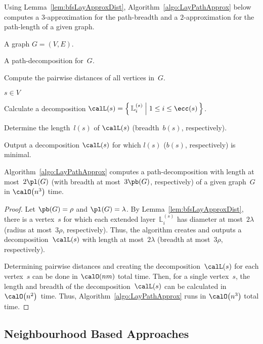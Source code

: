Using Lemma~\ref{lem:bfsLayApproxDist}, Algorithm~\ref{algo:LayPathApprox} below computes a $3$-approximation for the path-breadth and a $2$-approximation for the path-length of a given graph.

\begin{algorithm}
    [htb]
    \caption
    {%
        A $2$-approximation algorithm for computing the path-length of a graph (respectively, $3$-approximation for path-breadth).
    }
    \label{algo:LayPathApprox}

\KwIn
{%
    A graph $G = (V, E)$.
}

\KwOut
{%
    A path-decomposition for~$G$.
}

Compute the pairwise distances of all vertices in~$G$.

\ForEach
{%
    $s \in V$
}
{%
    Calculate a decomposition $\calL(s) = \left \{ \, \mathbb{L}_i^{(s)} \Bigm| 1 \leq i \leq \ecc(s) \, \right \}$.

    Determine the length~$l(s)$ of $\calL(s)$ (breadth~$b(s)$, respectively).
}

Output a decomposition $\calL(s)$ for which $l(s)$ ($b(s)$, respectively) is minimal.
\end{algorithm}

\begin{theorem}
    \label{theo:algoLayPathApprox}
Algorithm~\ref{algo:LayPathApprox} computes a path-decomposition with length at most~\( 2 \pl(G) \) (with breadth at most~\( 3 \pb(G) \), respectively) of a given graph~\( G \) in \( \calO \big( n^3 \big) \) time.
\end{theorem}

\begin{proof}
Let $\pb(G) = \rho$ and $\pl(G) = \lambda$.
By Lemma~\ref{lem:bfsLayApproxDist}, there is a vertex~$s$ for which each extended layer~$\mathbb{L}_i^{(s)}$ has diameter at most~$2 \lambda$ (radius at most~$3 \rho$, respectively).
Thus, the algorithm creates and outputs a decomposition~$\calL(s)$ with length at most~$2 \lambda$ (breadth at most~$3 \rho$, respectively).

Determining pairwise distances and creating the decomposition~$\calL(s)$ for each vertex~$s$ can be done in $\calO(nm)$ total time.
Then, for a single vertex~$s$, the length and breadth of the decomposition~$\calL(s)$ can be calculated in $\calO \big( n^2 \big)$~time.
Thus, Algorithm~\ref{algo:LayPathApprox} runs in $\calO \big( n^3 \big)$ total time.
\end{proof}

\subsection{Neighbourhood Based Approaches}

